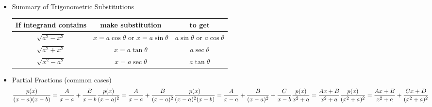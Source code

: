 \begin{itemize}
\begin{enumerate}
\begin{equation}
					\end{equation}
			\end{enumerate}
		\item Summary of Trigonometric Substitutions
			\begin{center} \begin{tabular}{|c|c|c|} \hline
				\textbf{If integrand contains} & \textbf{make substitution} & \textbf{to get} \\ \hline
				$\sqrt{a^2-x^2}$ & $x=a \cos \theta$ or $x=a \sin \theta$ & $a \sin \theta$ or $a \cos \theta$ \\ \hline
				$\sqrt{a^2 +x^2}$ & $x=a \tan \theta$ & $a \sec \theta$ \\ \hline
				$\sqrt{x^2-a^2}$ & $x=a \sec \theta$ & $a \tan \theta$ \\ \hline
			\end{tabular} \end{center}
		\item Partial Fractions (common cases)
			\begin{equation}
				\frac{p(x)}{(x-a)(x-b)} = \frac{A}{x-a} + \frac{B}{x-b} \\
				\frac{p(x)}{(x-a)^2} = \frac{A}{x-a}+\frac{B}{(x-a)^2} \\
				\frac{p(x)}{(x-a)^2(x-b)} = \frac{A}{x-a}+\frac{B}{(x-a)^2}+\frac{C}{x-b} \\
				\frac{p(x)}{x^2+a} = \frac{A x + B}{x^2 + a} \\
				\frac{p(x)}{(x^2+a)^2} = \frac{A x + B}{x^2+a} + \frac{Cx+D}{(x^2+a)^2}
			\end{equation}
	\end{itemize}
